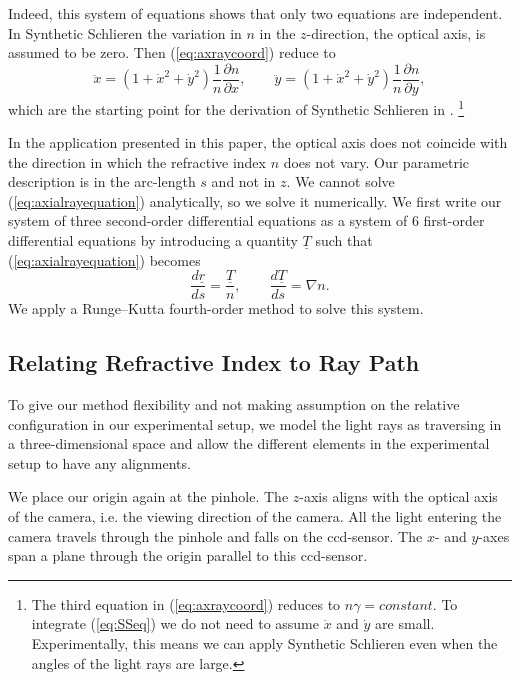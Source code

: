 \documentclass[smallextended]{svjour3}       %
\begin{document}
Indeed, this system of equations shows that only two equations are independent. In Synthetic Schlieren the variation in $n$ in the $z$-direction, the optical axis, is assumed to be zero. Then (\ref{eq:axraycoord}) reduce to
\begin{equation}
	\label{eq:SSeq}
		\ddot{x} = \left(1+\dot{x}^2+\dot{y}^2\right) \frac{1}{n} \frac{\partial n}{\partial x}, \qquad
		\ddot{y} = \left(1+\dot{x}^2+\dot{y}^2\right) \frac{1}{n} \frac{\partial n}{\partial y},
\end{equation}
which are the starting point for the derivation of Synthetic Schlieren in \cite{dalziel2000whole}.  \footnote{The third equation in (\ref{eq:axraycoord}) reduces to $n \gamma = constant$.  To integrate (\ref{eq:SSeq}) we do not need to assume $\dot{x}$ and $\dot{y}$ are small. Experimentally, this means we can apply Synthetic Schlieren even when the angles of the light rays are large. }

In the application presented in this paper, the optical axis does not coincide with the direction in which the refractive index $n$ does not vary. Our parametric description is in the arc-length $s$ and not in $z$.  We cannot solve (\ref{eq:axialrayequation}) analytically, so we solve it numerically. We first write our system of three second-order differential equations as a system of 6 first-order differential equations by introducing a quantity $\underline{T}$ \cite{southwell1982ray} such that (\ref{eq:axialrayequation}) becomes
\begin{equation}
	\label{eq:sys6foeq}
		\frac{d \underline{r}}{d s} = \frac{\underline{T}}{n}, \qquad
		\frac{d \underline{T}}{d s} = \nabla n.
\end{equation}
We apply a Runge–Kutta fourth-order method to solve this system. %

\subsection{Relating Refractive Index to Ray Path}
\label{subsec:RayPath}
To give our method flexibility and not making assumption on the relative configuration in our experimental setup, we model the light rays as traversing in a three-dimensional space and allow the different elements in the experimental setup to have any alignments.

We place our origin again at the pinhole. The $z$-axis aligns with the optical axis of the camera, i.e. the viewing direction of the camera. All the light entering the camera travels through the pinhole and falls on the ccd-sensor. The $x$- and $y$-axes span a plane through the origin parallel to this ccd-sensor. 
\end{document}
